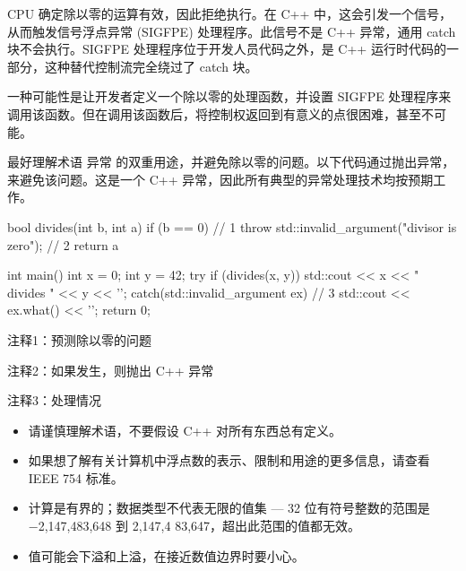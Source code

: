 CPU 确定除以零的运算有效，因此拒绝执行。在 C++ 中，这会引发一个信号，从而触发信号浮点异常 (SIGFPE) 处理程序。此信号不是 C++ 异常，通用 catch 块不会执行。SIGFPE 处理程序位于开发人员代码之外，是 C++ 运行时代码的一部分，这种替代控制流完全绕过了 catch 块。

一种可能性是让开发者定义一个除以零的处理函数，并设置 SIGFPE 处理程序来调用该函数。但在调用该函数后，将控制权返回到有意义的点很困难，甚至不可能。

最好理解术语 异常 的双重用途，并避免除以零的问题。以下代码通过抛出异常，来避免该问题。这是一个 C++ 异常，因此所有典型的异常处理技术均按预期工作。


\begin{cpp}
bool divides(int b, int a) {
  if (b == 0) // 1
    throw std::invalid_argument("divisor is zero"); // 2
  return a %
}

int main() {
  int x = 0;
  int y = 42;
  try {
    if (divides(x, y))
      std::cout << x << " divides " << y << '\n';
  } catch(std::invalid_argument ex) { // 3
    std::cout << ex.what() << '\n';
  }
  return 0;
}
\end{cpp}

{\footnotesize
注释1：预测除以零的问题

注释2：如果发生，则抛出 C++ 异常

注释3：处理情况
}


\begin{itemize}
\item
请谨慎理解术语，不要假设 C++ 对所有东西总有定义。

\item
如果想了解有关计算机中浮点数的表示、限制和用途的更多信息，请查看 IEEE 754 标准。

\item
计算是有界的；数据类型不代表无限的值集 — 32 位有符号整数的范围是 −2,147,483,648 到 2,147,4 83,647，超出此范围的值都无效。

\item
值可能会下溢和上溢，在接近数值边界时要小心。
\end{itemize}



















